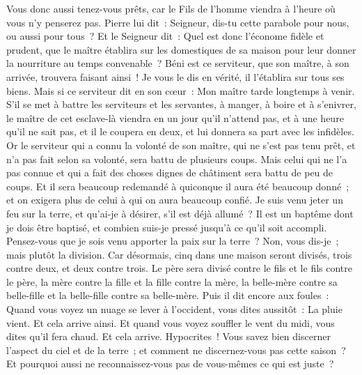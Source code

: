 \begin{multicols}{2}
Vous donc aussi tenez-vous prêts, car le Fils de l'homme viendra à l'heure où vous n'y penserez pas.
Pierre lui dit~: Seigneur, dis-tu cette parabole pour nous, ou aussi pour tous~?
Et le Seigneur dit~: Quel est donc l'économe fidèle et prudent, que le maître établira sur les domestiques de sa maison pour leur donner la nourriture au temps convenable~?
Béni est ce serviteur, que son maître, à son arrivée, trouvera faisant ainsi~!
Je vous le dis en vérité, il l'établira sur tous ses biens.
Mais si ce serviteur dit en son cœur~: Mon maître tarde longtemps à venir. S'il se met à battre les serviteurs et les servantes, à manger, à boire et à s'enivrer,
le maître de cet esclave-là viendra en un jour qu'il n'attend pas, et à une heure qu'il ne sait pas, et il le coupera en deux, et lui donnera sa part avec les infidèles.
Or le serviteur qui a connu la volonté de son maître, qui ne s'est pas tenu prêt, et n'a pas fait selon sa volonté, sera battu de plusieurs coups.
 Mais celui qui ne l'a pas connue et qui a fait des choses dignes de châtiment sera battu de peu de coups. Et il sera beaucoup redemandé à quiconque il aura été beaucoup donné~; et on exigera plus de celui à qui on aura beaucoup confié.
Je suis venu jeter un feu sur la terre, et qu'ai-je à désirer, s'il est déjà allumé~?
Il est un baptême dont je dois être baptisé, et combien suis-je pressé jusqu'à ce qu'il soit accompli.
Pensez-vous que je sois venu apporter la paix sur la terre~? Non, vous dis-je~; mais plutôt la division.
Car désormais, cinq dans une maison seront divisés, trois contre deux, et deux contre trois.
Le père sera divisé contre le fils et le fils contre le père, la mère contre la fille et la fille contre la mère, la belle-mère contre sa belle-fille et la belle-fille contre sa belle-mère.
Puis il dit encore aux foules~: Quand vous voyez un nuage se lever à l'occident, vous dites aussitôt~: La pluie vient. Et cela arrive ainsi.
Et quand vous voyez souffler le vent du midi, vous dites qu'il fera chaud. Et cela arrive.
Hypocrites~! Vous savez bien discerner l'aspect du ciel et de la terre~; et comment ne discernez-vous pas cette saison~?
Et pourquoi aussi ne reconnaissez-vous pas de vous-mêmes ce qui est juste~?

\end{multicols}
